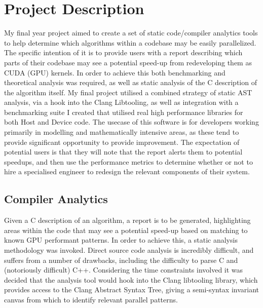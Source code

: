 
\section{Project Description} 
My final year project aimed to create a set of static code/compiler analytics tools to help determine
which algorithms within a codebase may be easily parallelized. The specific intention of it is to provide 
users with a report describing which parts of their codebase may see a potential speed-up from
redeveloping them as CUDA (GPU) \cite{cuda} kernels. In order to achieve this both benchmarking and theoretical
analysis was required, as well as static analysis of the C description of the algorithm itself. My
final project utilised a combined strategy of static AST analysis, via a hook into the Clang
Libtooling, as well as integration with a benchmarking suite I created that utilised real high
performance libraries for both Host and Device code. The usecase of this software is for developers
working primarily in modelling and mathematically intensive areas, as these tend to provide
significant opportunity to provide improvement. The expectation of potential users is that they will
note that the report alerts them to potential speedups, and then use the performance metrics to
determine whether or not to hire a specialised engineer to redesign the relevant components of their
system.

\subsection{Compiler Analytics} 
Given a C description of an algorithm, a report is to be generated,
highlighting areas within the code that may see a potential speed-up based on matching to known GPU
performant patterns. In order to achieve this, a static analysis methodology was invoked. Direct
source code analysis is incredibly difficult, and suffers from a number of drawbacks, including the
difficulty to parse C and (notoriously difficult) C++. Considering the time constraints involved it
was decided that the analysis tool would hook into the Clang libtooling  library, which provides access
to the Clang Abstract Syntax Tree, giving a semi-syntax invariant canvas from which to identify
relevant parallel patterns.

